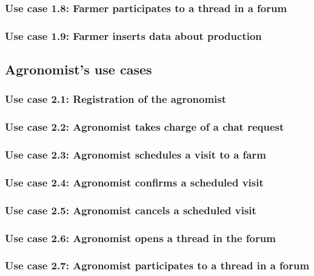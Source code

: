 \documentclass[10pt]{report}
\begin{document}
\subsubsection{Use case 1.8: Farmer participates to a thread in a forum}

\subsubsection{Use case 1.9: Farmer inserts data about production}

\subsection{Agronomist's use cases}
\subsubsection{Use case 2.1: Registration of the agronomist}

\subsubsection{Use case 2.2: Agronomist takes charge of a chat request}

\subsubsection{Use case 2.3: Agronomist schedules a visit to a farm}

\subsubsection{Use case 2.4: Agronomist confirms a scheduled visit}

\subsubsection{Use case 2.5: Agronomist cancels a scheduled visit}

\subsubsection{Use case 2.6: Agronomist opens a thread in the forum}

\subsubsection{Use case 2.7: Agronomist participates to a thread in a forum}

\end{document}
